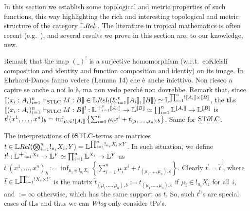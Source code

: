 
In this section we establish some topological and metric properties of such functions, this way highlighting the rich and interesting topological and metric structure of the category $\LREL_{!}$.
The literature in tropical mathematics is often recent (e.g.~\cite{Porzio2021}), and several results we prove in this section are, to our knowledge, new.

Remark that the map $(\_)^!$ is a surjective homomorphism (w.r.t.\ coKleisli composition and identity and function composition and identiy) on its image. {\color{red}In Ehrhard-Danos fanno vedere (Lemma 14) che \`e anche iniettivo. Non riesco a capire se anche a noi lo \`e, ma non vedo perch\'e non dovrebbe.}
Remark that, since $\model{(x_i:A_i)_{i=1}^n\vdash_{\STLC} M:B}\in\HOM{\LREL_!}{\mathlarger{\&}_{i=1}^n \model{A_i}}{\model B}\simeq\Lawv^{\prod_{i=1}^n ! \model {A_i}\times \model B}$, the tLs $\model{(x_i:A_i)_{i=1}^n\vdash_{\STLC} M:B}^!:\Lawv^{\mathlarger{+}_{i=1}^n \model{A_i}}\to\Lawv^{\model B} \simeq \prod_{i=1}^n\Lawv^{\model{A_i}}\to\Lawv^{\model B}$ is $t^!(x^1,\dots,x^n)_b=\inf_{\mu_i\in ! \llbracket A_i\rrbracket}\left\{\sum_{i=1}^n\mu_i x^i+t_{(\mu_1,\dots,\mu_n),b}\right\}$.
Same for $\mathrm{ST}\partial\mathrm{LC}$.

\begin{remark}
The interpretations of $\BSTLC$-terms are matrices $t\in\HOM{\LREL}{\bigotimes_{i=1}^n !_{n_i}X_i}{Y}=\Lawv^{\prod_{i=1}^n !_{n_i}X_i\times Y}$.
In such situation, we define $t^!:\Lawv^{\mathlarger{+}_{i=1}^n X_{i}}\to\Lawv^Y \simeq \prod_{i=1}^n\Lawv^{X_{i}}\to\Lawv^Y$ as $t^!(x^1,\dots,x^n)_b:=\inf_{\mu_i\in !_{n_i} X_i}\left\{\sum_{i=1}^n\mu_i x^i+t_{(\mu_1,\dots,\mu_n),b}\right\}$.
Clearly $t^!={\widetilde t}^!$, where $\widetilde t\in\mathbb{L}^{\prod_{i=1}^n ! {X_i}\times Y}$ is the matrix $\widetilde t_{(\mu_1,\dots,\mu_n),b}:=t_{(\mu_1,\dots,\mu_n),b}$ if $\mu_i\in !_{n_i} X_i$ for all $i$, and $:=\infty$ otherwise, which has the same support as $t$.
So, such $t^!$'s are special cases of tLs and thus we can \emph{Wlog} only consider tPs's.
\end{remark}

%


% 


